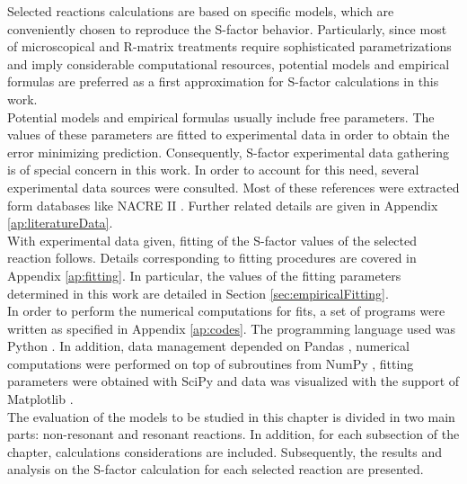 \documentclass[openany]{book}
\begin{document}
Selected reactions calculations are based on specific models, which are conveniently chosen to reproduce the S-factor behavior. Particularly, since most of microscopical and R-matrix treatments require sophisticated parametrizations and imply considerable computational resources, potential models and empirical formulas are preferred as a first approximation for S-factor calculations in this work.  \\

Potential models and empirical formulas usually include free parameters. The values of these parameters are fitted to experimental data in order to obtain the error minimizing prediction. Consequently, S-factor experimental data gathering is of special concern in this work. In order to account for this need, several experimental data sources were consulted. Most of these references were extracted form databases like NACRE II \cite{xu_takahashi_goriely_arnould_ohta_utsunomiya_2013}. Further related details are given in Appendix \ref{ap:literatureData}. \\ 

With experimental data given, fitting of the S-factor values of the selected reaction follows. Details corresponding to fitting procedures are covered in Appendix \ref{ap:fitting}.  In particular, the values of the fitting parameters determined in this work are detailed in Section \ref{sec:empiricalFitting}.  \\

In order to perform the numerical computations for fits, a set of programs were written as specified in Appendix \ref{ap:codes}. The programming language used was Python \cite{rossum_drake_2009}. In addition, data management depended on Pandas \cite{mckinney_2010}, numerical computations were performed on top of subroutines from NumPy  \cite{harris_millman_vanderwalt_gommers_virtanen_cournapeau_wieser_taylor_berg_smith_et_2020}, fitting parameters were obtained with SciPy \cite{virtanen_gommers_oliphant_haberland_reddy_cournapeau_burovski_peterson_weckesser_bright_et_2020} and data was visualized with the support of Matplotlib \cite{hunter_2007}. \\

The evaluation of the models to be studied in this chapter is divided in two main parts: non-resonant and resonant reactions.  In addition, for each subsection of the chapter, calculations considerations are included. Subsequently, the results and analysis on the S-factor calculation for each  selected reaction are presented.
\end{document}
